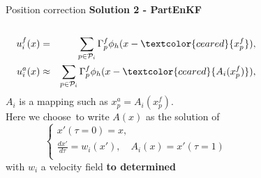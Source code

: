 \documentclass[aspectratio=169]{beamer} %
\begin{document}
\begin{frame}{Position correction}
    \textbf{Solution 2 - PartEnKF} \\
    \begin{columns}[t]
        \begin{column}{0.6\textwidth}
            \vspace{-0.7cm}

            \begin{eqnarray*}
                u_i^f(x) &=& \sum_{p \in \mathcal P_i} \Gamma^f_p \phi_h(x - \textcolor{ceared}{x_p^f}), \\
                u_i^a(x) &\approx& \sum_{p \in \mathcal P_i} \Gamma^f_p \phi_h(x - \textcolor{ceared}{A_i(x_p^f)}), \\
            \end{eqnarray*}
            $A_i$ is a mapping such as $x^a_{p} = A_i(x^f_{p})$. \\
            Here we choose~\footnotemark[1] to write $A(x)$ as the solution of\\
            \begin{equation*}
                \begin{cases}
                    x'(\tau = 0) = x,                                           \\
                    \frac{d x'}{d \tau} = w_i (x'), \quad A_i(x) = x'(\tau = 1) \\
                \end{cases}
            \end{equation*}with $w_i$ a velocity field \textbf{to determined}
        \end{column}
        \begin{column}{0.4\textwidth}
            \begin{figure}
                \centering

\end{figure}
\end{column}
\end{columns}
\end{frame}
\end{document}
